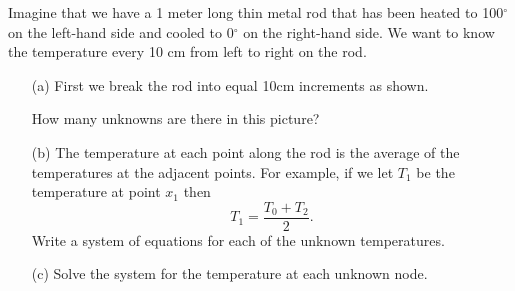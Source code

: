 \begin{problem}\label{prob:heated_rod_lin_alg}
    Imagine that we have a 1 meter long thin metal rod that has been heated to 100$^\circ$
    on the left-hand side and cooled to 0$^\circ$ on the right-hand side.  We want to know
    the temperature every 10 cm from left to right on the rod.
    \begin{enumerate}
        \item[(a)] First we break the rod into equal 10cm increments as shown.
            \begin{center}
            \end{center}
            How many unknowns are there in this picture?
        \item[(b)] The temperature at each point along the rod is the average of the
            temperatures at the adjacent points.  For example, if we let $T_1$ be the
            temperature at point $x_1$ then
            \[ T_1 = \frac{T_0 + T_2}{2}. \]
            Write a system of equations for each of the unknown temperatures.
        \item[(c)] Solve the system for the temperature at each unknown node.
    \end{enumerate}
\end{problem}


